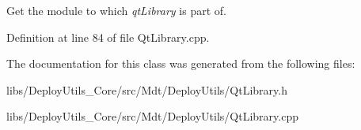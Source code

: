 Get the module to which {\itshape qt\+Library} is part of. 



Definition at line 84 of file Qt\+Library.\+cpp.



The documentation for this class was generated from the following files\+:\begin{DoxyCompactItemize}
\item 
libs/\+Deploy\+Utils\+\_\+\+Core/src/\+Mdt/\+Deploy\+Utils/Qt\+Library.\+h\item 
libs/\+Deploy\+Utils\+\_\+\+Core/src/\+Mdt/\+Deploy\+Utils/Qt\+Library.\+cpp\end{DoxyCompactItemize}
